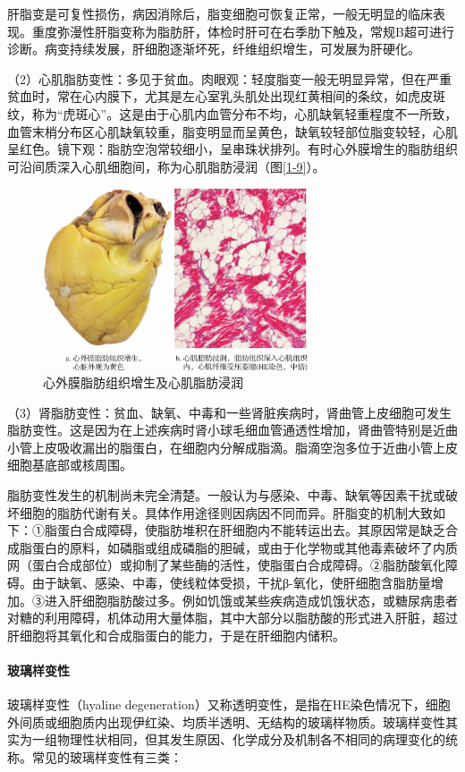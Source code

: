 肝脂变是可复性损伤，病因消除后，脂变细胞可恢复正常，一般无明显的临床表现。重度弥漫性肝脂变称为脂肪肝，体检时肝可在右季肋下触及，常规B超可进行诊断。病变持续发展，肝细胞逐渐坏死，纤维组织增生，可发展为肝硬化。

（2）心肌脂肪变性：多见于贫血。肉眼观：轻度脂变一般无明显异常，但在严重贫血时，常在心内膜下，尤其是左心室乳头肌处出现红黄相间的条纹，如虎皮斑纹，称为“虎斑心”。这是由于心肌内血管分布不均，心肌缺氧轻重程度不一所致，血管末梢分布区心肌缺氧较重，脂变明显而呈黄色，缺氧较轻部位脂变较轻，心肌呈红色。镜下观：脂肪空泡常较细小，呈串珠状排列。有时心外膜增生的脂肪组织可沿间质深入心肌细胞间，称为心肌脂肪浸润（图\ref{1-9}）。
\begin{figure}[!htbp]
	\centering
	\includegraphics[width=0.7\textwidth]{./images/Image00010.jpg}
	\caption{心外膜脂肪组织增生及心肌脂肪浸润}
	\label{fig1-9}
\end{figure}

（3）肾脂肪变性：贫血、缺氧、中毒和一些肾脏疾病时，肾曲管上皮细胞可发生脂肪变性。这是因为在上述疾病时肾小球毛细血管通透性增加，肾曲管特别是近曲小管上皮吸收漏出的脂蛋白，在细胞内分解成脂滴。脂滴空泡多位于近曲小管上皮细胞基底部或核周围。

脂肪变性发生的机制尚未完全清楚。一般认为与感染、中毒、缺氧等因素干扰或破坏细胞的脂肪代谢有关。具体作用途径则因病因不同而异。肝脂变的机制大致如下：①脂蛋白合成障碍，使脂肪堆积在肝细胞内不能转运出去。其原因常是缺乏合成脂蛋白的原料，如磷脂或组成磷脂的胆碱，或由于化学物或其他毒素破坏了内质网（蛋白合成部位）或抑制了某些酶的活性，使脂蛋白合成障碍。②脂肪酸氧化障碍。由于缺氧、感染、中毒，使线粒体受损，干扰β-氧化，使肝细胞含脂肪量增加。③进入肝细胞脂肪酸过多。例如饥饿或某些疾病造成饥饿状态，或糖尿病患者对糖的利用障碍，机体动用大量体脂，其中大部分以脂肪酸的形式进入肝脏，超过肝细胞将其氧化和合成脂蛋白的能力，于是在肝细胞内储积。

\paragraph{玻璃样变性}
玻璃样变性（hyaline
degeneration）又称透明变性，是指在HE染色情况下，细胞外间质或细胞质内出现伊红染、均质半透明、无结构的玻璃样物质。玻璃样变性其实为一组物理性状相同，但其发生原因、化学成分及机制各不相同的病理变化的统称。常见的玻璃样变性有三类：

